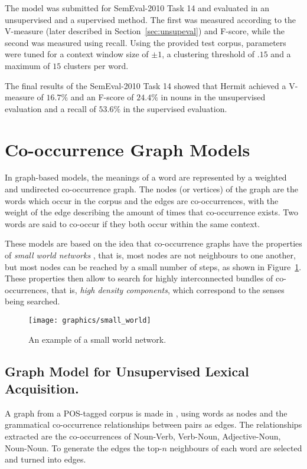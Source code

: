 The model was submitted for SemEval-2010 Task 14 \cite{manandhar2009semeval}
and evaluated in an unsupervised and a supervised method. The first was measured
according to the V-measure (later described in Section~\ref{sec:unsupeval}) and
F-score, while the second was measured using recall. Using the provided test
corpus, parameters were tuned for a context window size of $\pm1$, a clustering
threshold of $.15$ and a maximum of $15$ clusters per word.

The final results of the SemEval-2010 Task 14 showed that Hermit achieved a
V-measure of $16.7\%$ and an F-score of $24.4\%$ in nouns in the unsupervised
evaluation and a recall of $53.6\%$ in the supervised evaluation.

\section{Co-occurrence Graph Models}

In graph-based models, the meanings of a word are represented by a weighted
and undirected co-occurrence graph. The nodes (or vertices) of the graph are the
words which occur in the corpus and the edges are co-occurrences, with the
weight of the edge describing the amount of times that co-occurrence exists. Two
words are said to co-occur if they both occur within the same context.

These models are based on the idea that co-occurrence graphs have the properties
of \textit{small world networks} \cite{veronis2004hyperlex}, that is, most nodes
are not neighbours to one another, but most nodes can be reached by a small
number of steps, as shown in Figure~\ref{fig:small-world}. These properties
then allow to search for highly interconnected bundles of co-occurrences, that
is, \textit{high density components}, which correspond to the senses being
searched.

\begin{figure}
 \centering
 \texttt{[image: graphics/small\_world]}
 \caption{An example of a small world network.}
 \label{fig:small-world}
\end{figure}

\subsection{Graph Model for Unsupervised Lexical Acquisition.}

A graph from a \ac{POS}-tagged corpus is made in \cite{widdows2002graph}, using
words as nodes and the grammatical co-occurrence relationships between pairs as
edges. The relationships extracted are the co-occurrences of Noun-Verb,
Verb-Noun, Adjective-Noun, Noun-Noun. To generate the edges the top-$n$
neighbours of each word are selected and turned into edges.

